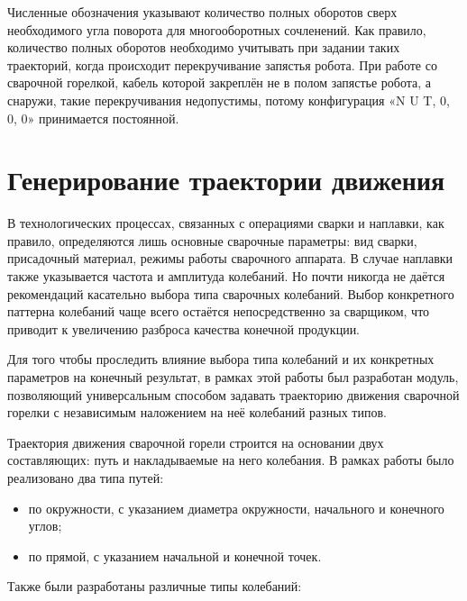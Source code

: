 Численные обозначения указывают количество полных оборотов сверх необходимого угла поворота для многооборотных сочленений.
Как правило, количество полных оборотов необходимо учитывать при задании таких траекторий, когда происходит перекручивание запястья робота.
При работе со сварочной горелкой, кабель которой закреплён не в полом запястье робота, а снаружи, такие перекручивания недопустимы, потому конфигурация «N U T, 0, 0, 0» принимается постоянной.


\section{Генерирование траектории движения}
В технологических процессах, связанных с операциями сварки и наплавки, как правило, определяются лишь основные сварочные параметры: вид сварки, присадочный материал, режимы работы сварочного аппарата.
В случае наплавки также указывается частота и амплитуда колебаний.
Но почти никогда не даётся рекомендаций касательно выбора типа сварочных колебаний.
Выбор конкретного паттерна колебаний чаще всего остаётся непосредственно за сварщиком, что приводит к увеличению разброса качества конечной продукции.

Для того чтобы проследить влияние выбора типа колебаний и их конкретных параметров на конечный результат, в рамках этой работы был разработан модуль, позволяющий универсальным способом задавать траекторию движения сварочной горелки с независимым наложением на неё колебаний разных типов.


Траектория движения сварочной горели строится на основании двух составляющих: путь и накладываемые на него колебания.
В рамках работы было реализовано два типа путей:

\begin{itemize}
    \item по окружности, с указанием диаметра окружности, начального и конечного углов;
    \item по прямой, с указанием начальной и конечной точек.
\end{itemize}

Также были разработаны различные типы колебаний:

